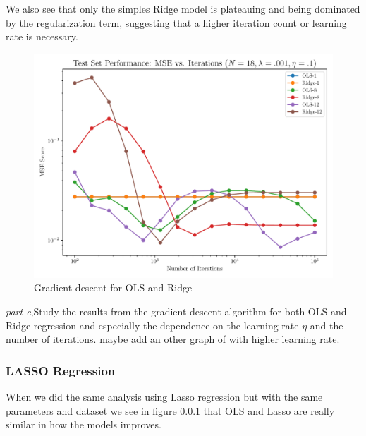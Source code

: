 \documentclass[amssymb,twocolumn,aps]{revtex4}
\begin{document}
We also see that only the simples Ridge model is plateauing and being dominated by the regularization term, suggesting that a higher iteration count or learning rate is necessary.


\begin{figure}[h]
    \centering
    \includegraphics[width=.95 \linewidth]{Figures/Gradient_Comparison_OLS_Ridge_18.pdf}
    \caption{Gradient descent for OLS and Ridge}
    \label{fig:DescOLSRidge}
\end{figure}




\textit{part c},Study the results from the gradient descent algorithm for both OLS and Ridge regression and especially the dependence on the learning rate $\eta$ and the number of iterations. maybe add an other graph of with higher learning rate.



\subsubsection{LASSO Regression}
When we did the same analysis using Lasso regression but with the same parameters and dataset we see in figure \ref{} that OLS and Lasso are really similar in how the models improves.
\end{document}
